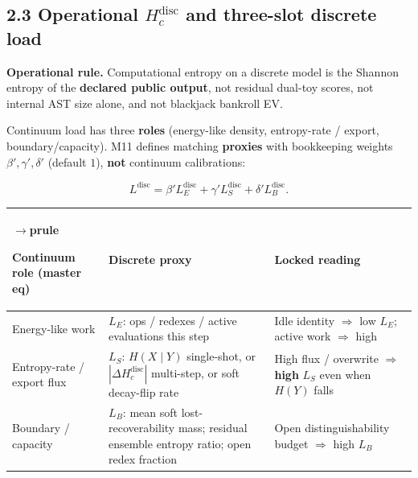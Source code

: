 \documentclass[
  11pt,
]{article}
\newcounter{none} %
\begin{document}
\subsection{\texorpdfstring{2.3 Operational \(H_c^{\mathrm{disc}}\) and three-slot discrete load}{2.3 Operational H\_c\^{}\{\textbackslash mathrm\{disc\}\} and three-slot discrete load}}\label{operational-h_cmathrmdisc-and-three-slot-discrete-load}

\textbf{Operational rule.} Computational entropy on a discrete model is the Shannon entropy of the \textbf{declared public output}, not residual dual-toy scores, not internal AST size alone, and not blackjack bankroll EV.

Continuum load has three \textbf{roles} (energy-like density, entropy-rate / export, boundary/capacity). M11 defines matching \textbf{proxies} with bookkeeping weights \(\beta',\gamma',\delta'\) (default \(1\)), \textbf{not} continuum calibrations:

\[
L^{\mathrm{disc}}
=
\beta' L_E^{\mathrm{disc}}
+
\gamma' L_S^{\mathrm{disc}}
+
\delta' L_B^{\mathrm{disc}}.
\]

{\def\LTcaptype{none} %
\begin{longtable}[]{@{}
  >{\raggedright\arraybackslash}p{}
  >{\raggedright\arraybackslash}p{}
  >{\raggedright\arraybackslash}p{}@{}}
$\rightarrow$prule\noalign{}
\begin{minipage}[b]{\linewidth}\raggedright
Continuum role (master eq)
\end{minipage} & \begin{minipage}[b]{\linewidth}\raggedright
Discrete proxy
\end{minipage} & \begin{minipage}[b]{\linewidth}\raggedright
Locked reading
\end{minipage} \\
\midrule\noalign{}
\endhead
\bottomrule\noalign{}
\endlastfoot
Energy-like work & \(L_E\): ops / redexes / active evaluations this step & Idle identity \(\Rightarrow\) low \(L_E\); active work \(\Rightarrow\) high \\
Entropy-rate / export flux & \(L_S\): \(H(X\mid Y)\) single-shot, or \(|\Delta H_c^{\mathrm{disc}}|\) multi-step, or soft decay-flip rate & High flux / overwrite \(\Rightarrow\) \textbf{high} \(L_S\) even when \(H(Y)\) falls \\
Boundary / capacity & \(L_B\): mean soft lost-recoverability mass; residual ensemble entropy ratio; open redex fraction & Open distinguishability budget \(\Rightarrow\) high \(L_B\) \\
\end{longtable}
}
\end{document}
